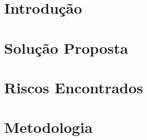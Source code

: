 % 



\chapter{Introdução} %


\chapter{Solução Proposta} %

\label{cha:solucao}


\chapter{Riscos Encontrados}



\chapter{Metodologia}

